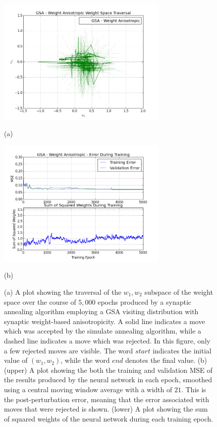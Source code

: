 \documentclass[11pt]{afthesis}
\begin{document}
	\begin{figure}[ht!]
		
		\begin{minipage}[b]{0.5\linewidth}
			\centering
			\centerline{\includegraphics[width = 3.25in]{figures/weight_space_gsa_wa.png}}
			\centerline{(a)}\medskip
		\end{minipage}
		\hfill
		\begin{minipage}[b]{0.5\linewidth}
			\centering
			\centerline{\includegraphics[width = 3.25in]{figures/weight_space_gsa_wa_perf.png}}
			\centerline{(b)}\medskip
		\end{minipage}
		\caption{
			(a) A plot showing the traversal of the $w_1,w_2$ subspace of the weight space over the course of $5,000$ epochs produced by a synaptic annealing algorithm employing a GSA visiting distribution with synaptic weight-based anisotropicity. A solid line indicates a move which was accepted by the simulate annealing algorithm, while a dashed line indicates a move which was rejected. In this figure, only a few rejected moves are visible. The word $start$ indicates the initial value of $(w_1,w_2)$, while the word $end$ denotes the final value. 
			(b) (upper) A plot showing the both the training and validation MSE of the results produced by the neural network in each epoch, smoothed using a central moving window average with a width of $21$. This is the post-perturbation error, meaning that the error associated with moves that were rejected is shown. (lower) A plot showing the sum of squared weights of the neural network during each training epoch.}
		\label{fig:weight_space_gsa_wa}
		
	\end{figure}
	
\end{document}
